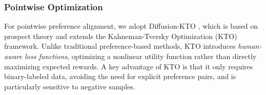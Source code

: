 \subsubsection{Pointwise Optimization}


For pointwise preference alignment, we adopt Diffusion-KTO \cite{ethayarajh2024ktomodelalignmentprospect}, which is based on prospect theory and extends the Kahneman-Tversky Optimization (KTO) framework. Unlike traditional preference-based methods, KTO introduces \textit{human-aware loss functions}, optimizing a nonlinear utility function rather than directly maximizing expected rewards. A key advantage of KTO is that it only requires binary-labeled data, avoiding the need for explicit preference pairs, and is particularly sensitive to negative samples.

